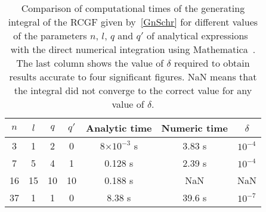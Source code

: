 \begin{table}[b]
      \centering
    \begin{tabular}{cccc|ccc}
         $n$ & $l$ & $q$ & $q'$ & Analytic time & Numeric time & $\delta$\\
        \hline
        \hline
    3 & 1 & 2 & 0 & 8$\times 10^{-3}$ s & 3.83 s & $10^{-4}$\\
    7 & 5 & 4 & 1 & 0.128 s & 2.39 s & $10^{-4}$\\
    16 & 15 & 10 & 10 & 0.188 s & NaN & NaN\\
    37 & 1 & 1 & 0 & 8.38 s & 39.6 s & $10^{-7}$\\
    \hline
    \end{tabular}
  \caption{Comparison of computational times of the generating
    integral of the RCGF given by~\eqref{GnSchr} for different values of the parameters $n$, $l$, $q$ and
    $q'$ of analytical expressions~\cite{Dzikowski_2020} with the direct numerical integration using Mathematica~\cite{Mathematica}. The last column shows the value of $\delta$
    required to obtain results accurate to four significant
    figures. NaN means that the integral did not converge to the
    correct value for any value of $\delta$.}\label{tab:GIntTime}
\end{table}

